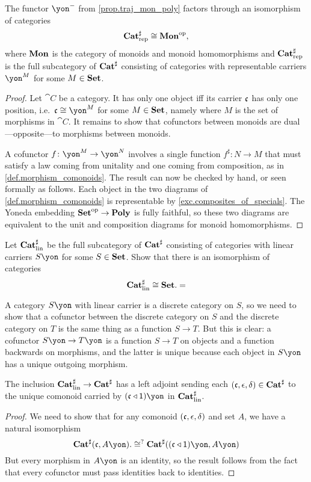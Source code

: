 \documentclass[Book-Poly]{subfiles}
\begin{document}
\begin{proposition}
The functor $\yon^-$ from \cref{prop.traj_mon_poly} factors through an isomorphism of categories
\[
    \mathbf{Cat}^\sharp_{\text{rep}}\cong\mathbf{Mon}^{\textnormal{op}},
\]
where $\mathbf{Mon}$ is the category of monoids and monoid homomorphisms and  $\mathbf{Cat}^\sharp_{\text{rep}}$ is the full subcategory of $\mathbf{Cat}^\sharp$ consisting of categories with representable carriers $\yon^M$ for some $M\in\mathbf{Set}$.
\end{proposition}
\begin{proof}
Let $\cat{C}$ be a category. It has only one object iff its carrier $\mathfrak{c}$ has only one position, i.e.\ $\car{c}\cong\yon^M$ for some $M\in\mathbf{Set}$, namely where $M$ is the set of morphisms in $\cat{C}$. It remains to show that cofunctors between monoids are dual---opposite---to morphisms between monoids.

A cofunctor $f\colon\yon^M\to\yon^N$ involves a single function $f^\sharp\colon N\to M$ that must satisfy a law coming from unitality and one coming from composition, as in \cref{def.morphism_comonoids}. The result can now be checked by hand, or seen formally as follows. Each object in the two diagrams of \eqref{def.morphism_comonoids} is representable by \cref{exc.composites_of_specials}. The Yoneda embedding $\mathbf{Set}^{\textnormal{op}}\to\mathbf{Poly}$ is fully faithful, so these two diagrams are equivalent to the unit and composition diagrams for monoid homomorphisms.
\end{proof}

\begin{exercise}\label{exc.lin_comon_set}
Let $\mathbf{Cat}^\sharp_{\text{lin}}$ be the full subcategory of $\mathbf{Cat}^\sharp$ consisting of categories with linear carriers $S\yon$ for some $S\in\mathbf{Set}$.
Show that there is an isomorphism of categories
\[
\mathbf{Cat}^\sharp_{\text{lin}}\cong\mathbf{Set}.=
\]
\begin{solution}
A category $S\yon$ with linear carrier is a discrete category on $S$, so we need to show that a cofunctor between the discrete category on $S$ and the discrete category on $T$ is the same thing as a function $S\to T$. But this is clear: a cofunctor $S\yon\to T\yon$ is a function $S\to T$ on objects and a function backwards on morphisms, and the latter is unique because each object in $S\yon$ has a unique outgoing morphism.
\end{solution}
\end{exercise}

\begin{proposition}
The inclusion $\mathbf{Cat}^\sharp_{\text{lin}}\to\mathbf{Cat}^\sharp$ has a left adjoint sending each $(\mathfrak{c},\epsilon,\delta)\in\mathbf{Cat}^\sharp$ to the unique comonoid carried by $(\car{c}\tri\1)\yon$ in $\mathbf{Cat}^\sharp_{\text{lin}}$.
\end{proposition}
\begin{proof}
We need to show that for any comonoid $(\mathfrak{c},\epsilon,\delta)$ and set $A$, we have a natural isomorphism
\[
  \smcat^\sharp(\car{c},A\yon).
  \cong^?
  \smcat^\sharp((\car{c}\tri\1)\yon,A\yon)
\]
But every morphism in $A\yon$ is an identity, so the result follows from the fact that every cofunctor must pass identities back to identities.
\end{proof}
\end{document}
